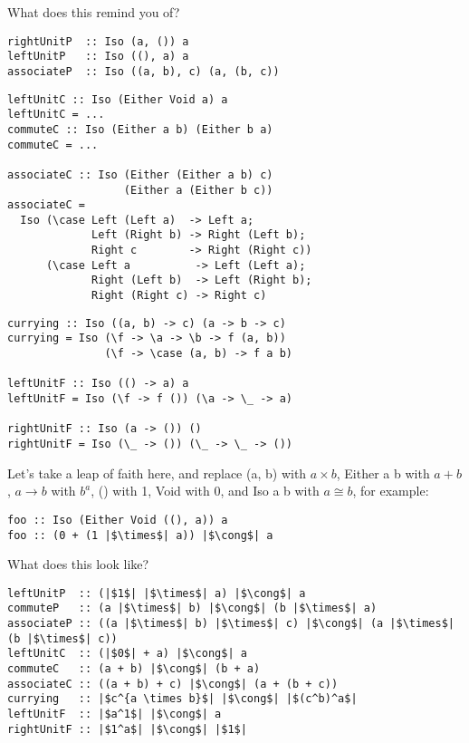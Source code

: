 \documentclass[tikz]{beamer}
\theoremstyle{definition}
\begin{document}
\begin{frame}[fragile]
What does this remind you of?
    
\begin{verbatim}
rightUnitP  :: Iso (a, ()) a
leftUnitP   :: Iso ((), a) a
associateP  :: Iso ((a, b), c) (a, (b, c))
\end{verbatim}
\end{frame}

\begin{frame}[fragile]
\begin{verbatim}
leftUnitC :: Iso (Either Void a) a
leftUnitC = ...
commuteC :: Iso (Either a b) (Either b a)
commuteC = ...
              
associateC :: Iso (Either (Either a b) c) 
                  (Either a (Either b c))
associateC = 
  Iso (\case Left (Left a)  -> Left a;
             Left (Right b) -> Right (Left b);
             Right c        -> Right (Right c))
      (\case Left a          -> Left (Left a);
             Right (Left b)  -> Left (Right b);
             Right (Right c) -> Right c)
\end{verbatim}
\end{frame}

\begin{frame}[fragile]
\begin{verbatim}
currying :: Iso ((a, b) -> c) (a -> b -> c)
currying = Iso (\f -> \a -> \b -> f (a, b))
               (\f -> \case (a, b) -> f a b)
               
leftUnitF :: Iso (() -> a) a
leftUnitF = Iso (\f -> f ()) (\a -> \_ -> a)

rightUnitF :: Iso (a -> ()) ()
rightUnitF = Iso (\_ -> ()) (\_ -> \_ -> ())
\end{verbatim}
\end{frame}

\begin{frame}[fragile]
Let's take a leap of faith here, and replace (a, b) with $a \times b$, Either a b with $a + b$, $a \rightarrow b$ with $b^a$, () with 1, Void with 0, and Iso a b with $a \cong b$, for example:

\begin{verbatim}
foo :: Iso (Either Void ((), a)) a
foo :: (0 + (1 |$\times$| a)) |$\cong$| a
\end{verbatim}
\end{frame}



\begin{frame}[fragile]
What does this look like?

\begin{verbatim}
leftUnitP  :: (|$1$| |$\times$| a) |$\cong$| a
commuteP   :: (a |$\times$| b) |$\cong$| (b |$\times$| a)
associateP :: ((a |$\times$| b) |$\times$| c) |$\cong$| (a |$\times$| (b |$\times$| c))
leftUnitC  :: (|$0$| + a) |$\cong$| a
commuteC   :: (a + b) |$\cong$| (b + a)
associateC :: ((a + b) + c) |$\cong$| (a + (b + c))
currying   :: |$c^{a \times b}$| |$\cong$| |$(c^b)^a$|
leftUnitF  :: |$a^1$| |$\cong$| a
rightUnitF :: |$1^a$| |$\cong$| |$1$|
\end{verbatim}
\end{frame}
\end{document}
